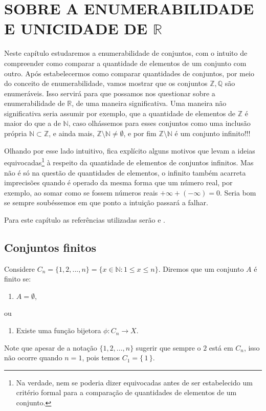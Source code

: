 \documentclass[../main.tex]{subfiles}
\makeatletter
\newcounter{saveenumerate}
\newcommand{\enumeratext}[1]{%
\setcounter{saveenumerate}{\value{enum\romannumeral\the\@enumdepth}}
\end{enumerate}
#1
\begin{enumerate}
\setcounter{enum\romannumeral\the\@enumdepth}{\value{saveenumerate}}%
}
\makeatother
\begin{document}
\chapter{SOBRE A ENUMERABILIDADE E UNICIDADE DE $\mathbb{R}$ }\label{cap-enumerabilidade}

Neste capítulo estudaremos a enumerabilidade de conjuntos, com o intuito de compreender como comparar a quantidade de elementos de um conjunto com outro. Após estabelecermos como comparar quantidades de conjuntos, por meio do conceito de enumerabilidade, vamos mostrar que os conjuntos $\mathbb{Z}, \mathbb{Q}$ são enumeráveis. Isso servirá para que possamos nos questionar sobre a enumerabilidade de $\mathbb{R}$, de uma maneira significativa. Uma maneira não significativa seria assumir por exemplo, que a quantidade de elementos de $\mathbb{Z}$ é maior do que a de $\mathbb{N}$, caso olhássemos para esses conjuntos como uma inclusão própria $\mathbb{N} \subset \mathbb{Z}$, e ainda mais, $\mathbb{Z} \setminus \mathbb{N} \neq \emptyset$, e por fim $\mathbb{Z} \setminus \mathbb{N}$ é um conjunto infinito!!! 

Olhando por esse lado intuitivo, fica explícito alguns motivos que levam a ideias equivocadas\footnote{Na verdade, nem se poderia dizer equivocadas antes de ser estabelecido um critério formal para a comparação de quantidades de elementos de um conjunto.} à respeito da quantidade de elementos de conjuntos infinitos. Mas não é só na questão de quantidades de elementos, o infinito também acarreta imprecisões quando é operado da mesma forma que um número real, por exemplo, ao somar como se fossem números reais $+\infty + (-\infty) = 0 $. Seria bom se sempre soubéssemos em que ponto a intuição passará a falhar.

Para este capítulo as referências utilizadas serão \textcite{lima-analise-1} e \textcite{bartle}.


\section{Conjuntos finitos}
\begin{defi}\label{enum-def-conjuntoFinito}
    Considere $C_n = \{ 1, 2, ..., n \} = \{ x \in \mathbb{N} : 1 \leq x \leq n \}$. Diremos que um conjunto $A$ é finito se:
    \begin{enumerate}[label=(\roman*)]
        \item $A = \emptyset$,
        \enumeratext{ou}
        \item Existe uma função bijetora $\phi \colon C_n \to X$.
    \end{enumerate}
\end{defi}
\begin{obs}
    Note que apesar de a notação $\{ 1,2,...,n \}$ sugerir que sempre o $2$ está em $C_n$, isso não ocorre quando $n=1$, pois temos $C_1 = \{\,1\,\}$.
\end{obs}
\end{document}
